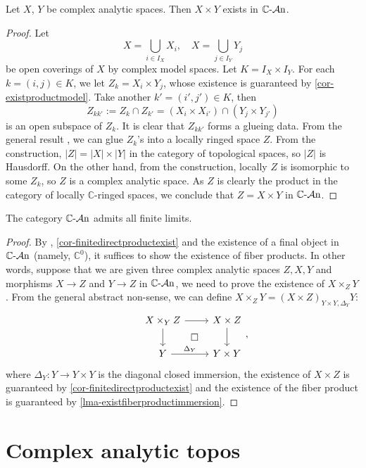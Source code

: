 \begin{corollary}\label{cor-finitedirectproductexist}
    Let $X$, $Y$ be complex analytic spaces. Then $X\times Y$ exists in $\mathbb{C}\text{-}\mathcal{A}\mathrm{n}$.
\end{corollary}
\begin{proof}
    Let 
    \[
        X=\bigcup_{i\in I_X} X_i,\quad   X=\bigcup_{j\in I_Y} Y_j
    \]
    be open coverings of $X$ by complex model spaces. Let $K=I_X\times I_Y$. For each $k=(i,j)\in K$, we let $Z_k=X_i\times Y_j$, whose existence is guaranteed by \cref{cor-existproductmodel}. Take another $k'=(i',j')\in K$, then 
    \[
        Z_{kk'}:=Z_k\cap Z_{k'}=(X_i\times X_{i'})\cap (Y_{j}\times Y_{j'})
    \]
    is an open subspace of $Z_k$. It is clear that $Z_{kk'}$ forms a glueing data. From the general result \cite[\href{https://stacks.math.columbia.edu/tag/01JB}{Tag 01JB}]{stacks-project}, we can glue $Z_k$'s into a locally ringed space $Z$. From the construction, $|Z|=|X|\times |Y|$ in the category of topological spaces, so $|Z|$ is Hausdorff. On the other hand, from the construction, locally $Z$ is isomorphic to some $Z_k$, so $Z$ is a complex analytic space. As $Z$ is clearly the product in the category of locally $\mathbb{C}$-ringed spaces, we conclude that $Z=X\times Y$ in  $\mathbb{C}\text{-}\mathcal{A}\mathrm{n}$.
\end{proof}

\begin{corollary}
    The category $\mathbb{C}\text{-}\mathcal{A}\mathrm{n}$ admits all finite limits.
\end{corollary}
\begin{proof}
    By \cite[\href{https://stacks.math.columbia.edu/tag/002O}{Tag 002O}]{stacks-project}, \cref{cor-finitedirectproductexist} and the existence of a final object in $\mathbb{C}\text{-}\mathcal{A}\mathrm{n}$ (namely, $\mathbb{C}^0$), it suffices to show the existence of fiber products. In other words, suppose that we are given three complex analytic spaces $Z,X,Y$ and morphisms $X\rightarrow Z$ and $Y\rightarrow Z$ in $\mathbb{C}\text{-}\mathcal{A}\mathrm{n}$, we need to prove the existence of $X\times_Z Y$. From the general abstract non-sense, we can define $X\times_Z Y=(X\times Z)_{Y\times Y,\Delta_Y}Y$:
    \[ 
    \begin{tikzcd}
        & X\times_Y Z \arrow[r]\arrow[d]\arrow[rd,"\square",phantom] & X\times Z \arrow[d]\\
        & Y  \arrow[r,"\Delta_Y"] & Y\times Y
    \end{tikzcd},
    \]
    where $\Delta_Y:Y\rightarrow Y\times Y$ is the diagonal closed immersion, the existence of $X\times Z$ is guaranteed by \cref{cor-finitedirectproductexist} and the existence of the fiber product is guaranteed by \cref{lma-existfiberproductimmersion}.
\end{proof}
 
\section{Complex analytic topos}

\printbibliography
